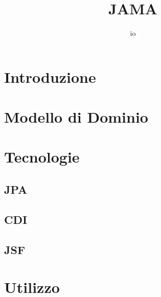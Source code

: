 \documentclass[a4paper,10pt]{report}
\title{JAMA}
\author{io}
\begin{document}
\maketitle


\begin{abstract}
\end{abstract}

\tableofcontents

\chapter{Introduzione}
\chapter{Modello di Dominio}
\chapter{Tecnologie}
\section{JPA}
\section{CDI}
\section{JSF}
\chapter{Utilizzo}
\end{document}
